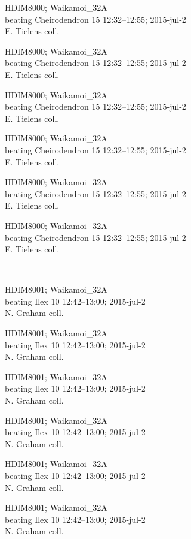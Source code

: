 \documentclass[2pt]{extarticle}
\begin{document}
\noindent
\parbox{0.16\textwidth}{\tiny \raggedright \rule[-0.3\baselineskip]{0pt}{10pt}HDIM8000; Waikamoi\_32A\\ beating Cheirodendron 15 12:32--12:55; 2015-jul-2\\ E. Tielens coll.}
\parbox{0.16\textwidth}{\tiny \raggedright \rule[-0.3\baselineskip]{0pt}{10pt}HDIM8000; Waikamoi\_32A\\ beating Cheirodendron 15 12:32--12:55; 2015-jul-2\\ E. Tielens coll.}
\parbox{0.16\textwidth}{\tiny \raggedright \rule[-0.3\baselineskip]{0pt}{10pt}HDIM8000; Waikamoi\_32A\\ beating Cheirodendron 15 12:32--12:55; 2015-jul-2\\ E. Tielens coll.}
\parbox{0.16\textwidth}{\tiny \raggedright \rule[-0.3\baselineskip]{0pt}{10pt}HDIM8000; Waikamoi\_32A\\ beating Cheirodendron 15 12:32--12:55; 2015-jul-2\\ E. Tielens coll.}
\parbox{0.16\textwidth}{\tiny \raggedright \rule[-0.3\baselineskip]{0pt}{10pt}HDIM8000; Waikamoi\_32A\\ beating Cheirodendron 15 12:32--12:55; 2015-jul-2\\ E. Tielens coll.}
\parbox{0.16\textwidth}{\tiny \raggedright \rule[-0.3\baselineskip]{0pt}{10pt}HDIM8000; Waikamoi\_32A\\ beating Cheirodendron 15 12:32--12:55; 2015-jul-2\\ E. Tielens coll.} \\ 
\vspace{0.001in} 

\noindent
\parbox{0.16\textwidth}{\tiny \raggedright \rule[-0.3\baselineskip]{0pt}{10pt}HDIM8001; Waikamoi\_32A\\ beating Ilex 10 12:42--13:00; 2015-jul-2\\ N. Graham coll.}
\parbox{0.16\textwidth}{\tiny \raggedright \rule[-0.3\baselineskip]{0pt}{10pt}HDIM8001; Waikamoi\_32A\\ beating Ilex 10 12:42--13:00; 2015-jul-2\\ N. Graham coll.}
\parbox{0.16\textwidth}{\tiny \raggedright \rule[-0.3\baselineskip]{0pt}{10pt}HDIM8001; Waikamoi\_32A\\ beating Ilex 10 12:42--13:00; 2015-jul-2\\ N. Graham coll.}
\parbox{0.16\textwidth}{\tiny \raggedright \rule[-0.3\baselineskip]{0pt}{10pt}HDIM8001; Waikamoi\_32A\\ beating Ilex 10 12:42--13:00; 2015-jul-2\\ N. Graham coll.}
\parbox{0.16\textwidth}{\tiny \raggedright \rule[-0.3\baselineskip]{0pt}{10pt}HDIM8001; Waikamoi\_32A\\ beating Ilex 10 12:42--13:00; 2015-jul-2\\ N. Graham coll.}
\parbox{0.16\textwidth}{\tiny \raggedright \rule[-0.3\baselineskip]{0pt}{10pt}HDIM8001; Waikamoi\_32A\\ beating Ilex 10 12:42--13:00; 2015-jul-2\\ N. Graham coll.} \\ 
\vspace{0.001in} 
\end{document}
